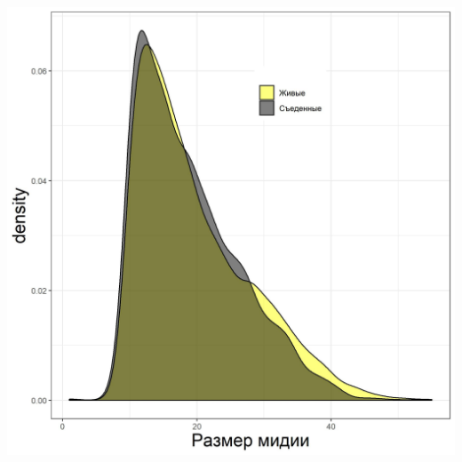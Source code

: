 \documentclass[20pt,a0,portrait]{a0poster}
\begin{document}
\vspace{1cm}


\begin{minipage}[t]{0.5\linewidth}


\subsection*{}
		





%
\begin{minipage}[t]{0.46\linewidth}		
	\begin{center}\vspace{0.1cm}
			\includegraphics[width=0.9\linewidth]{Size_dist_ast.jpg}
			\label{Fig_siz_ast}
		\end{center}\vspace{0.5cm}
\end{minipage}\hspace{1cm}
%
\begin{minipage}[t]{0.46\linewidth}		
	\begin{center}\vspace{0.1cm}

\end{center}
\end{minipage}
\end{minipage}
\end{document}
